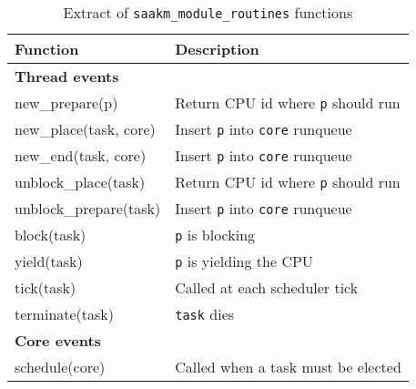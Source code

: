 \begin{table}[htbp]
        \caption{Extract of \texttt{saakm\_module\_routines} functions}
        \begin{tabular}{|l|l|}
        \hline
        \textbf{Function} & \textbf{Description} \\
        \hline
                \textbf{Thread events} &\\
                new\_prepare(p) & Return CPU id where \texttt{p} should run\\
                new\_place(task, core) & Insert \texttt{p} into \texttt{core} runqueue\\
                new\_end(task, core) & Insert \texttt{p} into \texttt{core} runqueue\\
                unblock\_place(task) & Return CPU id where \texttt{p} should run\\
                unblock\_prepare(task) & Insert \texttt{p} into \texttt{core} runqueue\\
                block(task) & \texttt{p} is blocking\\
                yield(task) & \texttt{p} is yielding the CPU\\
                tick(task) & Called at each scheduler tick \\
                terminate(task) & \texttt{task} dies \\
                \hline
                \textbf{Core events} & \\
                \hline
                schedule(core) & Called when a task must be elected\\

\end{tabular}
\end{table}
